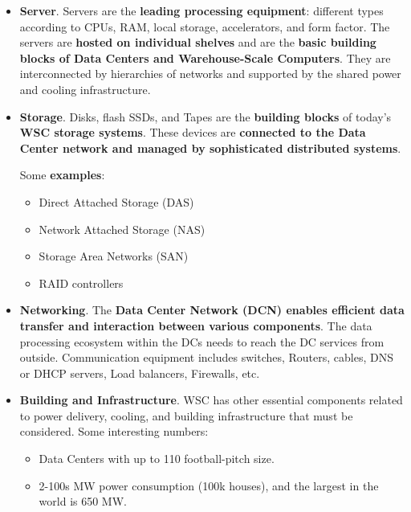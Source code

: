 \documentclass[a4paper]{article}
\newcommand{\example}[1]{\textcolor{Green4}{\textbf{#1}}}
\begin{document}
    \begin{itemize}
        \item \textbf{Server}. Servers are the \textbf{leading processing equipment}: different types according to CPUs, RAM, local storage, accelerators, and form factor. The servers are \textbf{hosted on individual shelves} and are the \textbf{basic building blocks of Data Centers and Warehouse-Scale Computers}. They are interconnected by hierarchies of networks and supported by the shared power and cooling infrastructure.

        \item \textbf{Storage}. Disks, flash SSDs, and Tapes are the \textbf{building blocks} of today's \textbf{WSC storage systems}. These devices are \textbf{connected to the Data Center network and managed by sophisticated distributed systems}.
        
        Some \example{examples}:
        \begin{itemize}
            \item Direct Attached Storage (DAS)

            \item Network Attached Storage (NAS)

            \item Storage Area Networks (SAN)

            \item RAID controllers
        \end{itemize}

        \item \textbf{Networking}. The \textbf{Data Center Network (DCN) enables efficient data transfer and interaction between various components}. The data processing ecosystem within the DCs needs to reach the DC services from outside.
        Communication equipment includes switches, Routers, cables, DNS or DHCP servers, Load balancers, Firewalls, etc.

        \item \textbf{Building and Infrastructure}. WSC has other essential components related to power delivery, cooling, and building infrastructure that must be considered. Some interesting numbers:
        \begin{itemize}
            \item Data Centers with up to 110 football-pitch size.
            
            \item 2-100s MW power consumption (100k houses), and the largest in the world is 650 MW.
        \end{itemize}
    \end{itemize}


    \newpage

    {}
    

    \newpage

    \printindex
\end{document}

